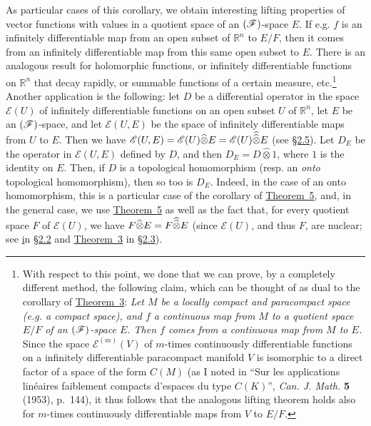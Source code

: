 \documentclass{article}
\theoremstyle{plain}
\newcommand{\sEE}{\mathscr{E}}
\newcommand{\FF}{\mbox{\normalfont($\mathscr{F}$)}}
\newcommand{\hotimes}{\widehat{\otimes}}
\newcommand{\hhotimes}{\skew{0}{\widehat}{\skew{0}\widehat{\otimes}}}
\begin{document}
As particular cases of this corollary, we obtain interesting lifting properties of vector functions with values in a quotient space of an $\FF$-space $E$.
If e.g. $f$ is an infinitely differentiable map from an open subset of $\mathbb{R}^n$ to $E/F$, then it comes from an infinitely differentiable map from this same open subset to $E$.
There is an analogous result for holomorphic functions, or infinitely differentiable functions on $\mathbb{R}^n$ that decay rapidly, or summable functions of a certain measure, etc.\footnote{%
  With respect to this point, we done that we can prove, by a completely different method, the following claim, which can be thought of as dual to the corollary of \hyperref[1.theorem3]{Theorem~3}:
  \emph{Let $M$ be a locally compact and paracompact space (e.g. a compact space), and $f$ a continuous map from $M$ to a quotient space $E/F$ of an $\FF$-space $E$. Then $f$ comes from a continuous map from $M$ to $E$.}
  Since the space $\sEE^{(m)}(V)$ of $m$-times continuously differentiable functions on a infinitely differentiable paracompact manifold $V$ is isomorphic to a direct factor of a space of the form $C(M)$ (as I noted in ``Sur les applications lin\'{e}aires faiblement compacts d'espaces du type $C(K)$'', \emph{Can. J. Math.} \textbf{5} (1953), p.~144), it thus follows that the analogous lifting theorem holds also for $m$-times continuously differentiable maps from $V$ to $E/F$.
}
Another application is the following: let $D$ be a differential operator in the space $\sEE(U)$ of infinitely differentiable functions on an open subset $U$ of $\mathbb{R}^n$, let $E$ be an $\FF$-space, and let $\sEE(U,E)$ be the space of infinitely differentiable maps from $U$ to $E$.
Then we have $\sEE(U,E)=\sEE(U)\hotimes E=\sEE(U)\hhotimes E$ (see \hyperref[2.5]{\S2.5}).
Let $D_E$ be the operator in $\sEE(U,E)$ defined by $D$, and then $D_E=D\hotimes1$, where $1$ is the identity on $E$.
Then, if $D$ is a topological homomorphism (resp. an \emph{onto} topological homomorphism), then so too is $D_E$.
Indeed, in the case of an onto homomorphism, this is a particular case of the corollary of \hyperref[1.theorem5]{Theorem~5}, and, in the general case, we use \hyperref[1.theorem5]{Theorem~5} as well as the fact that, for every quotient space $F$ of $\sEE(U)$, we have $F\hotimes E=F\hhotimes E$ (since $\sEE(U)$, and thus $F$, are nuclear; see \hyperref[2.definition1] in \hyperref[2.2]{\S2.2} and \hyperref[2.theorem3]{Theorem~3} in \hyperref[2.3]{\S2.3}).
\end{document}
